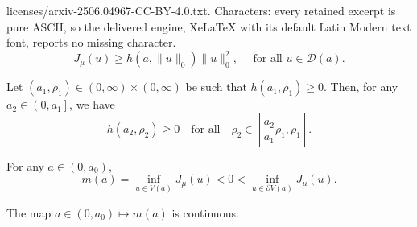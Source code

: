 \documentclass[10pt,a4paper]{amsart}
\begin{document}
licenses/arxiv-2506.04967-CC-BY-4.0.txt. Characters: every retained excerpt is pure ASCII, so the delivered engine, XeLaTeX with its default Latin Modern text font, reports no missing character.
  \begin{equation}\label{Eq-Phi>f}
    J_{\mu}(u) \geq {h\left(a,\|u\|_{0}\right)\| u\|_{0}^2}, \quad \text { for all } u \in \mathcal{D}(a).
  \end{equation}

    \begin{lemma}\label{lem5-f}
    Let $\left(a_1, \rho_1\right) \in(0, \infty) \times(0, \infty)$ be such that $h\left(a_1, \rho_1\right) \geq 0$. Then, for any $a_2 \in\left(0, a_1\right]$, we have
    $$
    h\left(a_2, \rho_2\right) \geq 0 \quad \text {for all} \quad \rho_2 \in\left[\frac{a_2}{a_1} \rho_1, \rho_1\right] .
    $$
    \end{lemma}

\begin{lemma}\label{Lem5-m(a)}
    For any $a \in\left(0, a_0\right)$,
    \begin{equation}\label{eq-m<0}
    m(a)=\inf _{u \in V(a)} J_\mu(u)<0<\inf _{u \in \partial V(a)} J_\mu(u).
    \end{equation}
\end{lemma}	

    \begin{lemma}\label{Lem4-m(a)cont}
    {   The map $a \in (0, a_0) \mapsto m(a)$ is continuous.}
    \end{lemma}
\end{document}
